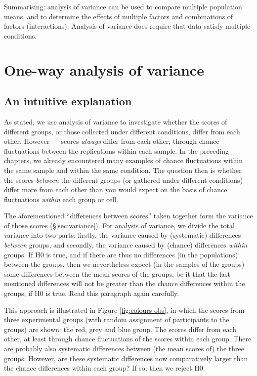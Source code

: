 \documentclass[
]{book}
\begin{document}
Summarising: analysis of variance can be used to compare multiple
population means, and to determine the effects of multiple
factors and combinations of factors (interactions).
Analysis of variance does require that data satisfy multiple
conditions.

\section{One-way analysis of variance}\label{one-way-analysis-of-variance}

\subsection{An intuitive explanation}\label{sec:anova-oneway-explanation}

As stated, we use analysis of variance to investigate whether the
scores of different groups, or those collected under different conditions,
differ from each other. However --- scores \emph{always} differ
from each other, through chance fluctuations between the replications within
each sample. In the preceding chapters, we already encountered
many examples of chance fluctuations within the same sample and within
the same condition. The question then is whether the scores
\emph{between} the different groups (or gathered under different
conditions) differ more from each other than you would expect on the
basis of chance fluctuations \emph{within} each group or cell.

The aforementioned ``differences between scores'' taken together form the
variance of those scores
(§\ref{sec:variance}). For analysis of variance, we divide the total
variance into two parts: firstly, the variance caused by (systematic)
differences \emph{between} groups, and secondly, the variance caused
by (chance) differences \emph{within} groups. If H0 is true,
and if there are thus no differences (in the populations) between the
groups, then we nevertheless expect (in the samples of the groups)
some differences between the mean scores of the groups, be it that
the last mentioned differences will not be greater than
the chance differences within the groups, if H0 is true.
Read this paragraph again carefully.

This approach is illustrated in
Figure \ref{fig:colours-obs}, in which the scores from three experimental
groups (with random assignment of participants to the groups) are shown:
the red, grey and blue group. The scores differ from each other, at least
through chance fluctuations of the scores within
each group. There are probably also systematic differences between (the
mean scores of) the three groups. However, are these systematic
differences now comparatively larger than the chance differences within each
group? If so, then we reject H0.
\end{document}
